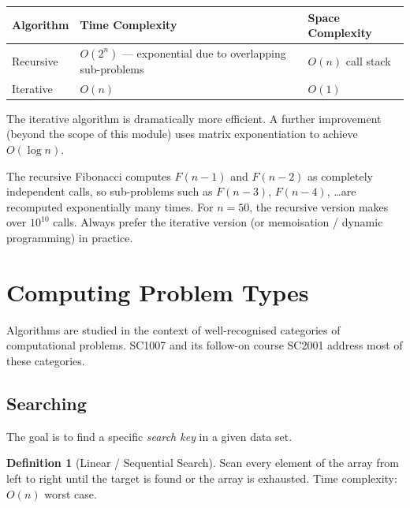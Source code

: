 \documentclass[11pt, a4paper, notitlepage]{report}
\theoremstyle{definition}
\newtheorem{definition}[theorem]{Definition}
\theoremstyle{remark}
\theoremstyle{definition}
\begin{document}
\begin{keyresult}[title={Fibonacci: Recursive vs.\ Iterative}]
\begin{center}
\begin{tabularx}{\linewidth}{@{}l X l@{}}
\toprule
\textbf{Algorithm} & \textbf{Time Complexity} & \textbf{Space Complexity} \\
\midrule
Recursive & $O(2^n)$ --- exponential due to overlapping sub-problems & $O(n)$ call stack \\
Iterative & $O(n)$ & $O(1)$ \\
\bottomrule
\end{tabularx}
\end{center}
The iterative algorithm is dramatically more efficient. A further improvement (beyond the scope
of this module) uses matrix exponentiation to achieve $O(\log n)$.
\end{keyresult}

\begin{warning}[title={Warning: Naive Recursion for Fibonacci}]
The recursive Fibonacci computes $F(n-1)$ and $F(n-2)$ as completely independent calls, so
sub-problems such as $F(n-3)$, $F(n-4)$, \ldots are recomputed exponentially many times.  For
$n = 50$, the recursive version makes over $10^{10}$ calls.  Always prefer the iterative
version (or memoisation / dynamic programming) in practice.
\end{warning}

\section{Computing Problem Types}
\label{sec:problem-types}

Algorithms are studied in the context of well-recognised categories of computational problems.
SC1007 and its follow-on course SC2001 address most of these categories.

\subsection{Searching}
\label{subsec:searching}

The goal is to find a specific \emph{search key} in a given data set.

\begin{definition}[Linear / Sequential Search]
Scan every element of the array from left to right until the target is found or the array is
exhausted.  Time complexity: $O(n)$ worst case.
\end{definition}
\end{document}
